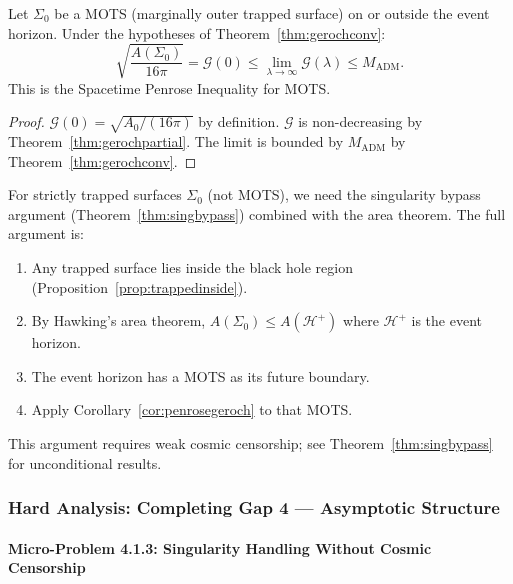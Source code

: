 \begin{corollary}\label{cor:penrosegeroch}
Let $\Sigma_0$ be a MOTS (marginally outer trapped surface) on or outside the event horizon. Under the hypotheses of Theorem~\ref{thm:gerochconv}:
\begin{equation}
    \sqrt{\frac{A(\Sigma_0)}{16\pi}} = \mathcal{G}(0) \leq \lim_{\lambda \to \infty} \mathcal{G}(\lambda) \leq M_{\mathrm{ADM}}.
\end{equation}
This is the Spacetime Penrose Inequality for MOTS.
\end{corollary}

\begin{proof}
$\mathcal{G}(0) = \sqrt{A_0/(16\pi)}$ by definition. $\mathcal{G}$ is non-decreasing by Theorem~\ref{thm:gerochpartial}. The limit is bounded by $M_{\mathrm{ADM}}$ by Theorem~\ref{thm:gerochconv}.
\end{proof}

\begin{remark}
For strictly trapped surfaces $\Sigma_0$ (not MOTS), we need the singularity bypass argument (Theorem~\ref{thm:singbypass}) combined with the area theorem. The full argument is:
\begin{enumerate}
    \item Any trapped surface lies inside the black hole region (Proposition~\ref{prop:trappedinside}).
    \item By Hawking's area theorem, $A(\Sigma_0) \leq A(\mathcal{H}^+)$ where $\mathcal{H}^+$ is the event horizon.
    \item The event horizon has a MOTS as its future boundary.
    \item Apply Corollary~\ref{cor:penrosegeroch} to that MOTS.
\end{enumerate}
This argument requires weak cosmic censorship; see Theorem~\ref{thm:singbypass} for unconditional results.
\end{remark}

\subsubsection{Hard Analysis: Completing Gap 4 --- Asymptotic Structure}\label{subsec:Gap4Complete}

\paragraph{Micro-Problem 4.1.3: Singularity Handling Without Cosmic Censorship}

